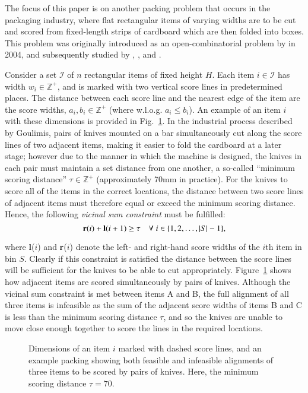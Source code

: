 \documentclass[authoryear]{elsarticle}
\begin{document}
The focus of this paper is on another packing problem that occurs in the packaging industry, where flat rectangular items of varying widths are to be cut and scored from fixed-length strips of cardboard which are then folded into boxes. This problem was originally introduced as an open-combinatorial problem by \citeauthor{goulimis2004} in 2004, and subsequently studied by \citet{lewis2011}, \citet{becker2015}, and \citet{hawa2018}.

Consider a set $\mathcal{I}$ of $n$ rectangular items of fixed height $H$. Each item $i \in \mathcal{I}$ has width $w_i \in \mathbb{Z}^+$, and is marked with two vertical score lines in predetermined places. The distance between each score line and the nearest edge of the item are the score widths, $a_i, b_i \in \mathbb{Z}^+$ (where w.l.o.g. $a_i \leq b_i$). An example of an item $i$ with these dimensions is provided in Fig.~\ref{fig:itemsdimknives}. In the industrial process described by Goulimis, pairs of knives mounted on a bar simultaneously cut along the score lines of two adjacent items, making it easier to fold the cardboard at a later stage; however due to the manner in which the machine is designed, the knives in each pair must maintain a set distance from one another, a so-called ``minimum scoring distance'' $\tau \in \mathbb{Z}^+$ (approximately 70mm in practice). For the knives to score all of the items in the correct locations, the distance between two score lines of adjacent items must therefore equal or exceed the minimum scoring distance. Hence, the following \emph{vicinal sum constraint} must be fulfilled:
\begin{equation}
	\textbf{r}(i) + \textbf{l}(i+1) \geq \tau \quad \forall \hspace{1mm} i \in \{1,2,\dotsc,|S|- 1\},
	\label{eqn:vsc}
\end{equation}

\noindent where \textbf{l}($i$) and \textbf{r}($i$) denote the left- and right-hand score widths of the $i$th item in bin $S$. Clearly if this constraint is satisfied the distance between the score lines will be sufficient for the knives to be able to cut appropriately. Figure~\ref{fig:itemsdimknives} shows how adjacent items are scored simultaneously by pairs of knives. Although the vicinal sum constraint is met between items A and B, the full alignment of all three items is infeasible as the sum of the adjacent score widths of items B and C is less than the minimum scoring distance $\tau$, and so the knives are unable to move close enough together to score the lines in the required locations.
\begin{figure}[H]	
	\centering
	
	\caption{Dimensions of an item $i$ marked with dashed score lines, and an example packing showing both feasible and infeasible alignments of three items to be scored by pairs of knives. Here, the minimum scoring distance $\tau = 70$.}	
	\label{fig:itemsdimknives}
\end{figure}
\end{document}
